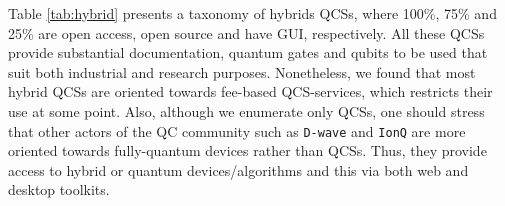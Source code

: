 \documentclass[conference]{IEEEtran}
\begin{document}
Table \ref{tab:hybrid} presents a taxonomy of hybrids QCSs, where 100\%, 75\% and 25\% are open access, open source and have GUI, respectively. All these QCSs provide substantial documentation, quantum gates and qubits to be used that suit both industrial and research purposes. Nonetheless, we found that most hybrid QCSs are oriented towards fee-based QCS-services, which restricts their use at some point. Also, although we enumerate only QCSs, one should stress that other actors of the QC community such as \texttt{D-wave} and \texttt{IonQ} are more oriented towards fully-quantum devices rather than QCSs. Thus, they provide access to hybrid or quantum devices/algorithms and this via both web and desktop toolkits. 


\begin{table*}[h!]	\centering
	\caption{Taxonomy of hybrid quantum computer simulators}
	\label{tab:hybrid}%
\end{table*}%

\vspace{-.25em}
\end{document}
